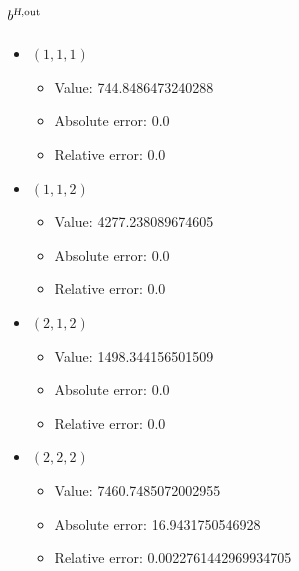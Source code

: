 \documentclass{article}%
\begin{document}
\subsection{$b^{\textsl{H},\text{out}}$}%
\begin{itemize}%
	\item $(1, 1, 1)$%
	\begin{itemize}%
		\item Value: 744.8486473240288%
		\item Absolute error: 0.0%
		\item Relative error: 0.0%
	\end{itemize}%
	\item $(1, 1, 2)$%
	\begin{itemize}%
		\item Value: 4277.238089674605%
		\item Absolute error: 0.0%
		\item Relative error: 0.0%
	\end{itemize}%
	\item $(2, 1, 2)$%
	\begin{itemize}%
		\item Value: 1498.344156501509%
		\item Absolute error: 0.0%
		\item Relative error: 0.0%
	\end{itemize}%
	\item $(2, 2, 2)$%
	\begin{itemize}%
		\item Value: 7460.7485072002955%
		\item Absolute error: 16.9431750546928%
		\item Relative error: 0.0022761442969934705%
	\end{itemize}%
\end{itemize}%
\end{document}
